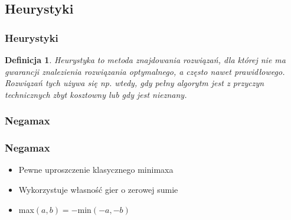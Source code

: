 \documentclass[polish,envcountsect,10pt]{beamer}
\newtheorem{mdfn}{Definicja}
\begin{document}
        \subsection{Heurystyki}
            \begin{frame}
                \frametitle{Heurystyki}
                \begin{mdfn}
                    Heurystyka to metoda znajdowania rozwiązań, dla której nie ma gwarancji znalezienia rozwiązania optymalnego, a często nawet prawidłowego. Rozwiązań tych używa się np. wtedy, gdy pełny algorytm jest z przyczyn technicznych zbyt kosztowny lub gdy jest nieznany.
                \end{mdfn}               
            \end{frame}
            \subsubsection{Negamax}
                \begin{frame}
                    \frametitle{Negamax}
                    \begin{itemize}
                        \item Pewne uproszczenie klasycznego minimaxa \pause
                        \item Wykorzystuje własność gier o zerowej sumie \pause
                        \item max$(a,b) = -$min$(-a,-b)$ \pause
                    \end{itemize}
                \end{frame}
            
\end{document}

